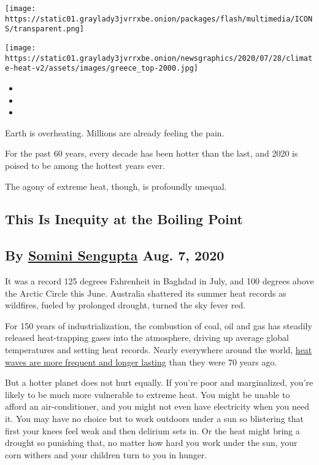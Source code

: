 \texttt{[image: https://static01.graylady3jvrrxbe.onion/packages/flash/multimedia/ICONS/transparent.png]}

\texttt{[image: https://static01.graylady3jvrrxbe.onion/newsgraphics/2020/07/28/climate-heat-v2/assets/images/greece\_top-2000.jpg]}

\begin{itemize}
\item
\item
\item
\end{itemize}

Earth is overheating. Millions are already feeling the pain.

For the past 60 years, every decade has been hotter than the last, and
2020 is poised to be among the hottest years ever.

The agony of extreme heat, though, is profoundly unequal.

\hypertarget{this-is-inequity-at-the-boiling-point}{%
\subsection{This Is Inequity at the Boiling
Point}\label{this-is-inequity-at-the-boiling-point}}

\hypertarget{-by-somini-sengupta-aug-7-2020}{%
\subsection{\texorpdfstring{ \textbf{By
\href{https://www.nytimes3xbfgragh.onion/by/somini-sengupta}{Somini
Sengupta}} Aug. 7,
2020}{ By Somini Sengupta Aug. 7, 2020}}\label{-by-somini-sengupta-aug-7-2020}}

It was a record 125 degrees Fahrenheit in Baghdad in July, and 100
degrees above the Arctic Circle this June. Australia shattered its
summer heat records as wildfires, fueled by prolonged drought, turned
the sky fever red.

For 150 years of industrialization, the combustion of coal, oil and gas
has steadily released heat-trapping gases into the atmosphere, driving
up average global temperatures and setting heat records. Nearly
everywhere around the world,
\href{https://climateextremes.org.au/heatwave-trends-accelerate-worldwide/}{heat
waves are more frequent and longer lasting} than they were 70 years ago.

But a hotter planet does not hurt equally. If you're poor and
marginalized, you're likely to be much more vulnerable to extreme heat.
You might be unable to afford an air-conditioner, and you might not even
have electricity when you need it. You may have no choice but to work
outdoors under a sun so blistering that first your knees feel weak and
then delirium sets in. Or the heat might bring a drought so punishing
that, no matter how hard you work under the sun, your corn withers and
your children turn to you in hunger.

